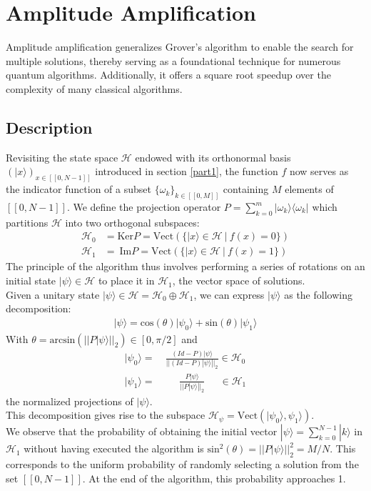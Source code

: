 \section{Amplitude Amplification}
\label{part2}

Amplitude amplification generalizes Grover's algorithm to enable the search for multiple solutions, thereby serving as a foundational technique for numerous quantum algorithms. Additionally, it offers a square root speedup over the complexity of many classical algorithms. \cite{brassard2002quantum}

\subsection{Description}
Revisiting the state space $\mathcal{H}$ endowed with its orthonormal basis $(|x \rangle )_{x \in [\![ 0, N-1 ]\!]}$ introduced in section \ref{part1}, the function $f$ now serves as the indicator function of a subset $\{ \omega_k \}_{k \in [\![ 0, M ]\!]}$ containing $M$ elements of $[\![ 0, N-1 ]\!]$.
We define the projection operator $P=\sum_{k = 0}^m |\omega_k \rangle \langle \omega_k |$ which partitions $\mathcal{H}$ into two orthogonal subspaces:
\begin{align*}
	\mathcal{H}_0 &= \mathrm{Ker}P = \mathrm{Vect}(\{ |x\rangle \in \mathcal{H} \ | \ f(x) = 0\}) \\
    \mathcal{H}_1 &= \ \mathrm{Im}P = \mathrm{Vect}(\{ |x\rangle \in \mathcal{H} \ | \ f(x) = 1\})    
\end{align*}
The principle of the algorithm thus involves performing a series of rotations on an initial state $| \psi \rangle \in \mathcal{H}$ to place it in $\mathcal{H}_1$, the vector space of solutions.
\\[5pt]
Given a unitary state $| \psi \rangle \in \mathcal{H} = \mathcal{H}_0 \oplus \mathcal{H}_1$,  we can express $| \psi \rangle$ as the following decomposition:
\begin{align*}
    |\psi \rangle = \mathrm{cos}(\theta)| \psi_0 \rangle + \mathrm{sin}(\theta)| \psi_1 \rangle
\end{align*}
With $\theta = \mathrm{arcsin}(||P |\psi \rangle||_2) \in [0, \pi / 2]$ and 
\begin{align*}
|\psi_0 \rangle =&\ \frac{(Id-P) |\psi \rangle}{||(Id-P) |\psi \rangle||_2} \in \mathcal{H}_0 \\ 
|\psi_1 \rangle =&\ \quad \ \, \frac{P |\psi \rangle}{||P |\psi \rangle||_2} \quad \ \ \in \mathcal{H}_1
\end{align*}
the normalized projections of $|\psi \rangle$.
\\[5pt]
This decomposition gives rise to the subspace $\mathcal{H}_{\psi} = \mathrm{Vect}(|\psi_0 \rangle, \psi_1 \rangle)$. 
\\[5pt]
We observe that the probability of obtaining the initial vector $|\psi \rangle = \sum_{k=0}^{N-1} |k\rangle$ in $\mathcal{H}_1$ without having executed the algorithm is $\mathrm{sin}^2(\theta) = ||P |\psi \rangle||_2^2 = M/N$. This corresponds to the uniform probability of randomly selecting a solution from the set $[\![ 0, N-1 ]\!]$. At the end of the algorithm, this probability approaches 1.

